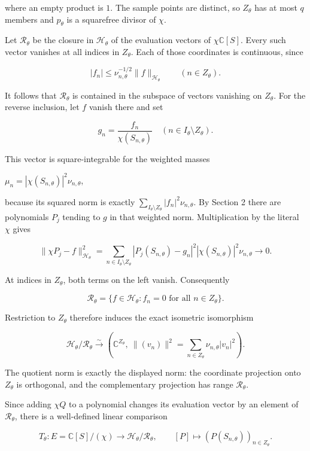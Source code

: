 \documentclass{article}
\begin{document}
where an empty product is \(1\). The sample points are distinct, so \(Z_\theta\) has at most \(q\) members and \(p_\theta\) is a squarefree divisor of \(\chi\).

Let \(\mathcal R_\theta\) be the closure in \(\mathcal H_\theta\) of the evaluation vectors of \(\chi \mathbb C[S]\). Every such vector vanishes at all indices in \(Z_\theta\). Each of those coordinates is continuous, since

\[
|f_n|\le\nu_{n,\theta}^{-1/2}\|f\|_{\mathcal H_\theta}
\qquad(n\in Z_\theta).
\tag{CQ15}
\]

It follows that \(\mathcal R_\theta\) is contained in the subspace of vectors vanishing on \(Z_\theta\). For the reverse inclusion, let \(f\) vanish there and set

\[
g_n=\frac{f_n}{\chi(S_{n,\theta})}
\quad(n\in I_\theta\setminus Z_\theta).
\tag{CQ16}
\]

This vector is square-integrable for the weighted masses

\(\mu_n = |\chi(S_{n,\theta})|^2 \nu_{n,\theta}\),

because its squared norm is exactly \(\sum_{I_\theta\setminus Z_\theta} |f_n|^2 \nu_{n,\theta}\). By Section 2 there are polynomials \(P_j\) tending to \(g\) in that weighted norm. Multiplication by the literal \(\chi\) gives

\[
\|\chi P_j-f\|_{\mathcal H_\theta}^2
=\sum_{n\in I_\theta\setminus Z_\theta}
|P_j(S_{n,\theta})-g_n|^2
|\chi(S_{n,\theta})|^2\nu_{n,\theta}\longrightarrow0.
\tag{CQ17}
\]

At indices in \(Z_\theta\), both terms on the left vanish. Consequently

\[
\mathcal R_\theta
=\{f\in\mathcal H_\theta:f_n=0\text{ for all }n\in Z_\theta\}.
\tag{CQ18}
\]

Restriction to \(Z_\theta\) therefore induces the exact isometric isomorphism

\[
\mathcal H_\theta/\mathcal R_\theta
\xrightarrow{\sim}
\left(\mathbb C^{Z_\theta},
\ \|(v_n)\|^2=\sum_{n\in Z_\theta}\nu_{n,\theta}|v_n|^2\right).
\tag{CQ19}
\]

The quotient norm is exactly the displayed norm: the coordinate projection onto \(Z_\theta\) is orthogonal, and the complementary projection has range \(\mathcal R_\theta\).

Since adding \(\chi Q\) to a polynomial changes its evaluation vector by an element of \(\mathcal R_\theta\), there is a well-defined linear comparison

\[
T_\theta:E=\mathbb C[S]/(\chi)
\longrightarrow\mathcal H_\theta/\mathcal R_\theta,
\qquad
[P]\longmapsto(P(S_{n,\theta}))_{n\in Z_\theta}.
\tag{CQ20}
\]
\end{document}
